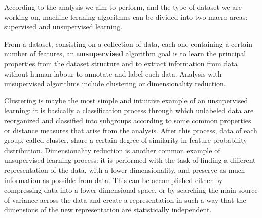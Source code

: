 \documentclass[11pt]{report}
\begin{document}
According to the analysis we aim to perform, and the type of dataset we are working on, machine leraning algorithms can be divided into two macro areas: supervised and unsupervised learning.

From a dataset, consisting on a collection of data, each one containing a certain number of features, an \textbf{unsupervised} algorithm goal is to learn the principal properties from the dataset structure and to extract information from data without human labour to annotate and label each data.
Analysis with unsupervised algorithms include clustering or dimensionality reduction.

Clustering is maybe the most simple and intuitive example of an unsupervised learning: it is basically a classification process through which unlabeled data are reorganized and classified into subgroups according to some common properties or distance measures that arise from the analysis.
After this process, data of each group, called cluster, share a certain degree of similarity in feature probability distribution.
Dimensionality reduction is another common example of unsupervised learning process: it is performed with the task of finding a different representation of the data, with a lower dimensionality, and preserve as much information as possible from data.
This can be accomplished either by compressing data into a lower-dimensional space, or by searching the main source of variance across the data and create a representation in such a way that the dimensions of the new representation are statistically independent.



\end{document}
